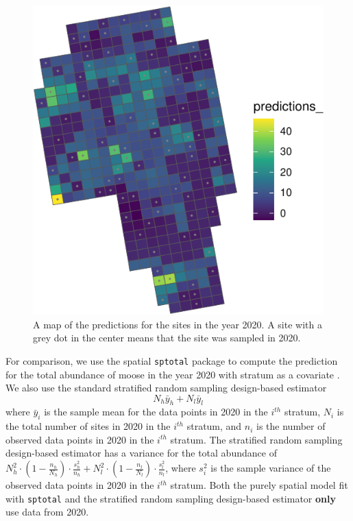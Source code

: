 \documentclass[]{interact}
\theoremstyle{plain}%
\theoremstyle{definition}
\theoremstyle{remark}
\begin{document}
\begin{figure}
\centering
\includegraphics{fpspatiotemp_manu_files/figure-latex/unnamed-chunk-8-1.pdf}
\caption{\label{fig:sitepredmap} A map of the predictions for the sites
in the year 2020. A site with a grey dot in the center means that the
site was sampled in 2020.}
\end{figure}

For comparison, we use the spatial \texttt{sptotal} package
\citep{higham2021sptotal} to compute the prediction for the total
abundance of moose in the year 2020 with stratum as a covariate
\citep{ver2008spatial}. We also use the standard stratified random
sampling design-based estimator \mbox{} \begin{equation*}
N_h \bar{y}_h + N_l \bar{y}_l
\end{equation*} \noindent where \(\bar{y}_i\) is the sample mean for the
data points in 2020 in the \(i^{th}\) stratum, \(N_i\) is the total
number of sites in 2020 in the \(i^{th}\) stratum, and \(n_i\) is the
number of observed data points in 2020 in the \(i^{th}\) stratum. The
stratified random sampling design-based estimator has a variance for the
total abundance of
\(N_h^2 \cdot (1 - \frac{n_h}{N_h}) \cdot \frac{s^2_h}{n_h} + N_l^2 \cdot (1 - \frac{n_l}{N_l}) \cdot \frac{s^2_l}{n_l}\),
where \(s^2_i\) is the sample variance of the observed data points in
2020 in the \(i^{th}\) stratum. Both the purely spatial model fit with
\texttt{sptotal} and the stratified random sampling design-based
estimator \textbf{only} use data from 2020.
\end{document}
